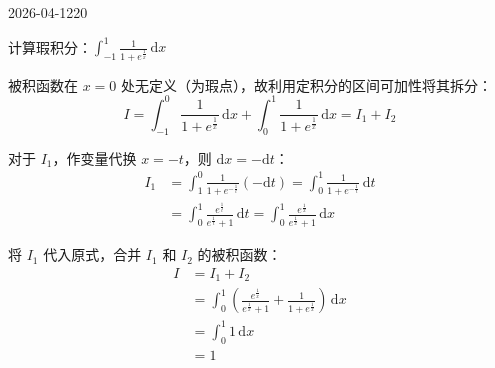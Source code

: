 \begin{mistake}{2026-04-12}{20}

\begin{problemcontent}
计算瑕积分：\(\displaystyle \int_{-1}^{1} \frac{1}{1 + e^{\frac{1}{x}}} \,\mathrm{d}x\)
\end{problemcontent}

\begin{solutioncontent}
被积函数在 \(x=0\) 处无定义（为瑕点），故利用定积分的区间可加性将其拆分：
\[
I = \int_{-1}^{0} \frac{1}{1 + e^{\frac{1}{x}}} \,\mathrm{d}x + \int_{0}^{1} \frac{1}{1 + e^{\frac{1}{x}}} \,\mathrm{d}x = I_1 + I_2
\]

对于 \(I_1\)，作变量代换 \(x = -t\)，则 \(\mathrm{d}x = -\mathrm{d}t\)：
\[
\begin{aligned}
I_1 &= \int_{1}^{0} \frac{1}{1 + e^{-\frac{1}{t}}} (-\mathrm{d}t) = \int_{0}^{1} \frac{1}{1 + e^{-\frac{1}{t}}} \,\mathrm{d}t \\
&= \int_{0}^{1} \frac{e^{\frac{1}{t}}}{e^{\frac{1}{t}} + 1} \,\mathrm{d}t = \int_{0}^{1} \frac{e^{\frac{1}{x}}}{e^{\frac{1}{x}} + 1} \,\mathrm{d}x
\end{aligned}
\]

将 \(I_1\) 代入原式，合并 \(I_1\) 和 \(I_2\) 的被积函数：
\[
\begin{aligned}
I &= I_1 + I_2 \\
&= \int_{0}^{1} \left( \frac{e^{\frac{1}{x}}}{e^{\frac{1}{x}} + 1} + \frac{1}{1 + e^{\frac{1}{x}}} \right) \,\mathrm{d}x \\
&= \int_{0}^{1} 1 \,\mathrm{d}x \\
&= 1
\end{aligned}
\]
\end{solutioncontent}


\end{mistake}
